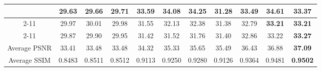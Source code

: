 \documentclass[10pt,twocolumn,letterpaper]{article}
\begin{document}
\begin{table}
\begin{center}
\begin{tabular}{|c||c|c|c|c|c|c|c|c|c|c|}
& 29.63 & 29.66 & 29.71 & 33.59 & 34.08 & 34.25 & 31.28 & 33.49 & \textbf{34.61} & 33.37
\\ 
\cline{2-11} 
\multirow{3}{*}{ISO = 6400}   
& 29.97 & 30.01 & 29.98 & 31.55 & 32.13 & 32.38 & 31.38 & 32.79 & \textbf{33.21} & \textbf{33.21}
\\ 
\cline{2-11}    
& 29.87 & 29.90 & 29.95 & 31.42 & 31.52 & 31.76 & 31.40 & 32.86 & 33.22 & \textbf{33.27}
\\
\hline
Average PSNR & 33.41 & 33.48 & 33.48 & 34.32 & 35.33 & 35.65 & 35.49 & 36.43 & 36.88 & \textbf{ 37.09}
\\
\hline
Average SSIM & 0.8483 & 0.8511 & 0.8512 & 0.9113 & 0.9250 & 0.9280 & 0.9126 & 0.9364 & 0.9481 & \textbf{ 0.9502}
\\
\hline
\end{tabular}
\end{center}
\end{table}
\end{document}
